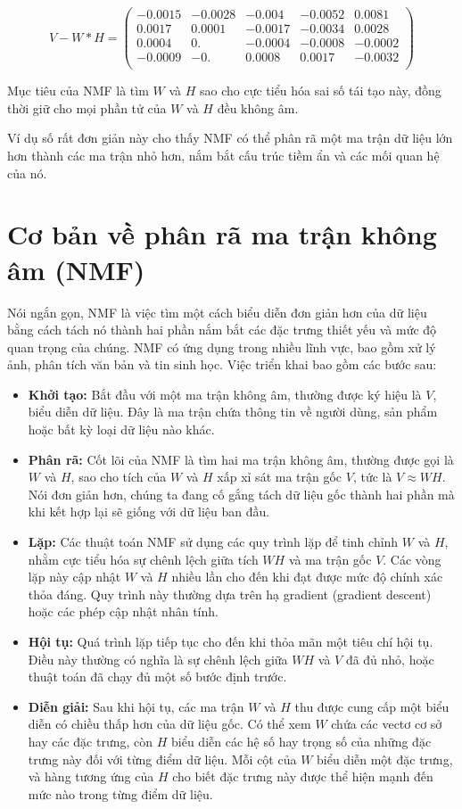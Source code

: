 \[V - W * H = \begin{pmatrix} -0.0015 & -0.0028 & -0.004 & -0.0052 & 0.0081 \\ 0.0017 & 0.0001 & -0.0017 & -0.0034 & 0.0028 \\ 0.0004 & 0. & -0.0004 & -0.0008 & -0.0002 \\ -0.0009 & -0. & 0.0008 & 0.0017 & -0.0032 \\ \end{pmatrix}\]

Mục tiêu của NMF là tìm \(W\) và \(H\) sao cho cực tiểu hóa sai số tái tạo này, đồng thời giữ cho mọi phần tử của \(W\) và \(H\) đều không âm.

Ví dụ số rất đơn giản này cho thấy NMF có thể phân rã một ma trận dữ liệu lớn hơn thành các ma trận nhỏ hơn, nắm bắt cấu trúc tiềm ẩn và các mối quan hệ của nó.

\section{Cơ bản về phân rã ma trận không âm (NMF)}

Nói ngắn gọn, NMF là việc tìm một cách biểu diễn đơn giản hơn của dữ liệu bằng cách tách nó thành hai phần nắm bắt các đặc trưng thiết yếu và mức độ quan trọng của chúng. NMF có ứng dụng trong nhiều lĩnh vực, bao gồm xử lý ảnh, phân tích văn bản và tin sinh học. Việc triển khai bao gồm các bước sau:

\begin{itemize}
\item
  \textbf{Khởi tạo:} Bắt đầu với một ma trận không âm, thường được ký hiệu là \(V\), biểu diễn dữ liệu. Đây là ma trận chứa thông tin về người dùng, sản phẩm hoặc bất kỳ loại dữ liệu nào khác.
\item
  \textbf{Phân rã:} Cốt lõi của NMF là tìm hai ma trận không âm, thường được gọi là \(W\) và \(H\), sao cho tích của \(W\) và \(H\) xấp xỉ sát ma trận gốc \(V\), tức là \(V \approx WH\). Nói đơn giản hơn, chúng ta đang cố gắng tách dữ liệu gốc thành hai phần mà khi kết hợp lại sẽ giống với dữ liệu ban đầu.
\item
  \textbf{Lặp:} Các thuật toán NMF sử dụng các quy trình lặp để tinh chỉnh \(W\) và \(H\), nhằm cực tiểu hóa sự chênh lệch giữa tích \(W H\) và ma trận gốc \(V\). Các vòng lặp này cập nhật \(W\) và \(H\) nhiều lần cho đến khi đạt được mức độ chính xác thỏa đáng. Quy trình này thường dựa trên hạ gradient (gradient descent) hoặc các phép cập nhật nhân tính.
\item
  \textbf{Hội tụ:} Quá trình lặp tiếp tục cho đến khi thỏa mãn một tiêu chí hội tụ. Điều này thường có nghĩa là sự chênh lệch giữa \(W H\) và \(V\) đã đủ nhỏ, hoặc thuật toán đã chạy đủ một số bước định trước.
\item
  \textbf{Diễn giải:} Sau khi hội tụ, các ma trận \(W\) và \(H\) thu được cung cấp một biểu diễn có chiều thấp hơn của dữ liệu gốc. Có thể xem \(W\) chứa các vectơ cơ sở hay các đặc trưng, còn \(H\) biểu diễn các hệ số hay trọng số của những đặc trưng này đối với từng điểm dữ liệu. Mỗi cột của \(W\) biểu diễn một đặc trưng, và hàng tương ứng của \(H\) cho biết đặc trưng này được thể hiện mạnh đến mức nào trong từng điểm dữ liệu.
\end{itemize}

